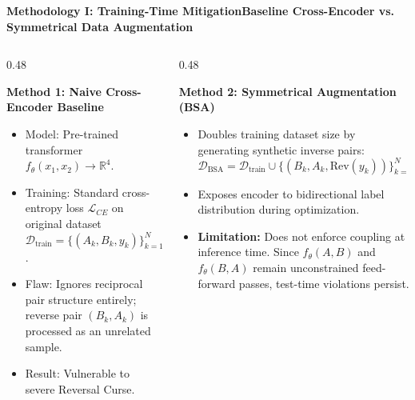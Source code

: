 \documentclass[aspectratio=169,10pt]{beamer}
\begin{document}
\begin{frame}{\textbf{Methodology I: Training-Time Mitigation}}{\textbf{Baseline Cross-Encoder vs. Symmetrical Data Augmentation}}
  \begin{columns}[T]
    \begin{column}{0.48\textwidth}
      \begin{block}{\textbf{Method 1: Naive Cross-Encoder Baseline}}
        \small
        \begin{itemize}
          \item Model: Pre-trained transformer $f_\theta(x_1, x_2) \to \mathbb{R}^4$.
          \item Training: Standard cross-entropy loss $\mathcal{L}_{CE}$ on original dataset $\mathcal{D}_{\text{train}} = \{(A_k, B_k, y_k)\}_{k=1}^N$.
          \item Flaw: Ignores reciprocal pair structure entirely; reverse pair $(B_k, A_k)$ is processed as an unrelated sample.
          \item Result: Vulnerable to severe Reversal Curse.
        \end{itemize}
      \end{block}
    \end{column}

    \begin{column}{0.48\textwidth}
      \begin{block}{\textbf{Method 2: Symmetrical Augmentation (BSA)}}
        \small
        \begin{itemize}
          \item Doubles training dataset size by generating synthetic inverse pairs:
          $$\mathcal{D}_{\text{BSA}} = \mathcal{D}_{\text{train}} \cup \{(B_k, A_k, \text{Rev}(y_k))\}_{k=1}^N$$
          \item Exposes encoder to bidirectional label distribution during optimization.
          \item \textbf{Limitation:} Does not enforce coupling at inference time. Since $f_\theta(A, B)$ and $f_\theta(B, A)$ remain unconstrained feed-forward passes, test-time violations persist.
        \end{itemize}
      \end{block}
    \end{column}
  \end{columns}
  \vspace{0.2cm}
  \centering
\end{frame}
\end{document}
